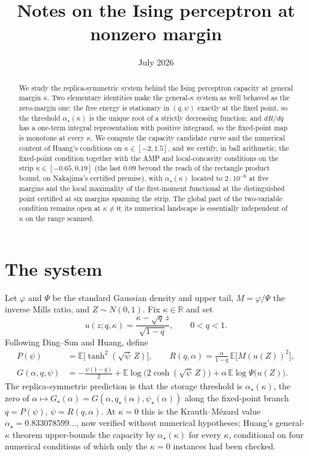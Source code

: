 \documentclass[11pt]{article}
\title{Notes on the Ising perceptron at nonzero margin}
\date{July 2026}
\theoremstyle{remark}
\newcommand{\E}{\mathbb{E}}
\newcommand{\R}{\mathbb{R}}
\begin{document}
\maketitle

\begin{abstract}
We study the replica-symmetric system behind the Ising perceptron
capacity at general margin $\kappa$.  Two elementary identities make
the general-$\kappa$ system as well behaved as the zero-margin one:
the free energy is stationary in $(q,\psi)$ exactly at the fixed point,
so the threshold $\alpha_\star(\kappa)$ is the unique root of a
strictly decreasing function; and $dR/dq$ has a one-term integral
representation with positive integrand, so the fixed-point map is
monotone at every $\kappa$.  We compute the capacity candidate curve
and the numerical content of Huang's conditions on
$\kappa\in[-2,1.5]$, and we certify, in ball arithmetic, the
fixed-point condition together with the AMP and local-concavity
conditions on the strip $\kappa\in[-0.65,0.19]$ (the last
$0.09$ beyond the reach of the rectangle product bound, on Nakajima's
certified premise), with
$\alpha_\star(\kappa)$ located to $2\cdot10^{-6}$ at five margins
and the local maximality of the first-moment functional at the
distinguished point certified at six margins spanning the strip.  The global part of the
two-variable condition remains open at $\kappa\neq 0$; its numerical
landscape is essentially independent of $\kappa$ on the range
scanned.
\end{abstract}

\section{The system}

Let $\varphi$ and $\Psi$ be the standard Gaussian density and upper
tail, $M=\varphi/\Psi$ the inverse Mills ratio, and $Z\sim N(0,1)$.
Fix $\kappa\in\R$ and set
\[
u(z;q,\kappa)=\frac{\kappa-\sqrt{q}\,z}{\sqrt{1-q}},\qquad
0<q<1 .
\]
Following Ding--Sun and Huang, define
\begin{align}
P(\psi)&=\E\bigl[\tanh^2(\sqrt{\psi}\,Z)\bigr],\qquad
R(q,\alpha)=\frac{\alpha}{1-q}\,\E\bigl[M(u(Z))^2\bigr],
\label{eq:PR}\\
G(\alpha,q,\psi)&=-\frac{\psi(1-q)}{2}
+\E\log\bigl(2\cosh(\sqrt{\psi}\,Z)\bigr)
+\alpha\,\E\log\Psi\bigl(u(Z)\bigr).
\label{eq:G}
\end{align}
The replica-symmetric prediction is that the storage threshold is
$\alpha_\star(\kappa)$, the zero of
$\alpha\mapsto G_\star(\alpha)=G(\alpha,q_\star(\alpha),\psi_\star(\alpha))$
along the fixed-point branch $q=P(\psi)$, $\psi=R(q,\alpha)$.  At
$\kappa=0$ this is the Krauth--M\'ezard value
$\alpha_\star=0.833078599\ldots$, now verified without numerical
hypotheses; Huang's general-$\kappa$ theorem upper-bounds the capacity
by $\alpha_\star(\kappa)$ for every $\kappa$, conditional on four
numerical conditions of which only the $\kappa=0$ instances had been
checked.
\end{document}
